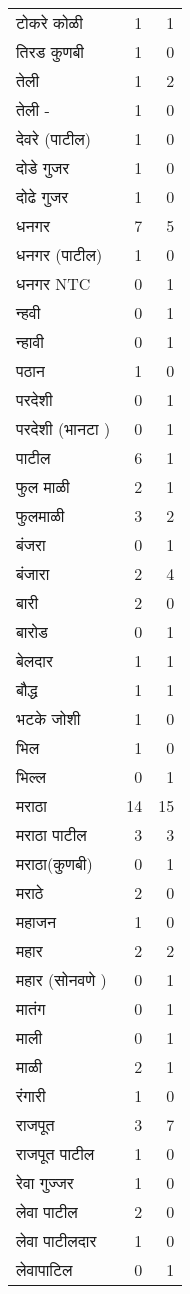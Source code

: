 \documentclass{article}
\begin{document}
\begin{table}
\begin{tabular}{lrr}
टोकरे कोळी & 1 & 1 \\
तिरड कुणबी & 1 & 0 \\
तेली & 1 & 2 \\
तेली - & 1 & 0 \\
देवरे (पाटील) & 1 & 0 \\
दोडे गुजर & 1 & 0 \\
दोढे गुजर & 1 & 0 \\
धनगर & 7 & 5 \\
धनगर (पाटील) & 1 & 0 \\
धनगर NTC & 0 & 1 \\
न्हवी & 0 & 1 \\
न्हावी & 0 & 1 \\
पठान & 1 & 0 \\
परदेशी & 0 & 1 \\
परदेशी (भानटा ) & 0 & 1 \\
पाटील & 6 & 1 \\
फुल माळी & 2 & 1 \\
फुलमाळी & 3 & 2 \\
बंजरा & 0 & 1 \\
बंजारा & 2 & 4 \\
बारी & 2 & 0 \\
बारोड & 0 & 1 \\
बेलदार & 1 & 1 \\
बौद्ध & 1 & 1 \\
भटके जोशी & 1 & 0 \\
भिल & 1 & 0 \\
भिल्ल & 0 & 1 \\
मराठा & 14 & 15 \\
मराठा पाटील & 3 & 3 \\
मराठा(कुणबी) & 0 & 1 \\
मराठे & 2 & 0 \\
महाजन & 1 & 0 \\
महार & 2 & 2 \\
महार (सोनवणे ) & 0 & 1 \\
मातंग & 0 & 1 \\
माली & 0 & 1 \\
माळी & 2 & 1 \\
रंगारी & 1 & 0 \\
राजपूत & 3 & 7 \\
राजपूत पाटील & 1 & 0 \\
रेवा गुज्जर & 1 & 0 \\
लेवा पाटील & 2 & 0 \\
लेवा पाटीलदार & 1 & 0 \\
लेवापाटिल & 0 & 1 \\

\end{tabular}
\end{table}
\end{document}
